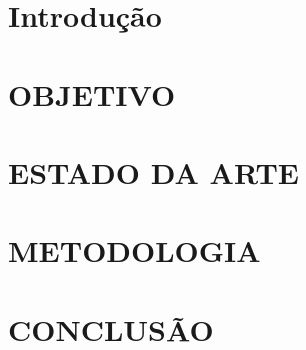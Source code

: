 \documentclass[
  a4paper,%
  12pt,%
  english,%
  brazilian,%
]{article}
\begin{document}





\section*{Introdução}%
\label{sect:intro}


\section*{OBJETIVO} \label{sect:obj}



\section*{ESTADO DA ARTE} \label{sect:estadoarte}



\section*{METODOLOGIA} \label{sect:metodologia}





\section*{CONCLUSÃO}\label{sect:conclusao}



\printbibliography

%

\end{document}
